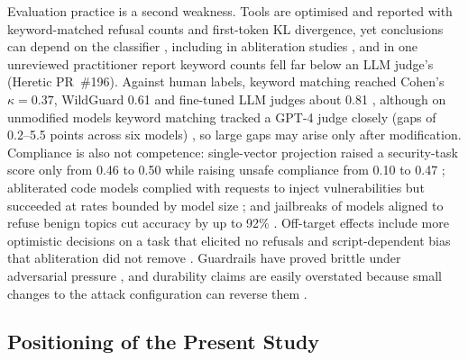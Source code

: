 Evaluation practice is a second weakness. Tools are optimised and reported
with keyword-matched refusal counts and first-token KL divergence, yet
conclusions can depend on the classifier \cite{young2026measuring}, including
in abliteration studies \cite{agnihotri2025granular}, and in one unreviewed
practitioner report keyword counts fell far below an LLM judge's (Heretic
PR~\#196).
Against human labels, keyword matching reached
Cohen's $\kappa=0.37$, WildGuard 0.61 and fine-tuned LLM judges about 0.81
\cite{xie2025sorrybench}, although on unmodified models keyword matching
tracked a GPT-4 judge closely (gaps of 0.2--5.5 points across six models) \cite{cui2025orbench}, so large gaps may arise only after
modification. Compliance is also not competence:
single-vector projection raised a security-task score only from 0.46 to 0.50
while raising unsafe compliance from 0.10 to 0.47 \cite{david2026ablating};
abliterated code models complied with requests to inject vulnerabilities but succeeded at
rates bounded by model size \cite{carleo2026willing}; and jailbreaks of models
aligned to refuse benign topics cut accuracy by up to 92\%
\cite{nikolic2025jailbreak}. Off-target effects include more optimistic
decisions on a task that elicited no refusals \cite{fafua2026abliteration} and
script-dependent bias that abliteration did not remove \cite{ko2026uncensored}.
Guardrails have proved brittle
under adversarial pressure \cite{young2025evaluating}, and durability
claims are easily overstated because small changes to the attack
configuration can reverse them \cite{qi2025durability}.

\subsection{Positioning of the Present Study}

